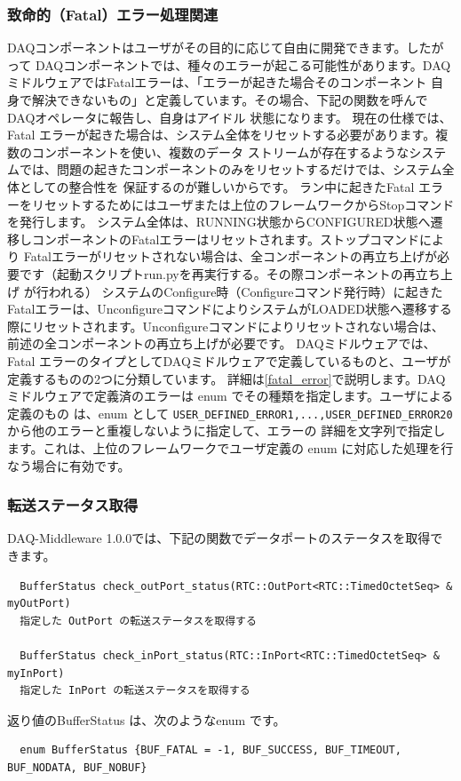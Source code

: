 \documentclass[a4j,10pt,dvips,onecolumn,oneside,final]{jarticle}%
\begin{document}
\subsubsection{致命的（Fatal）エラー処理関連}\label{fatal}
DAQコンポーネントはユーザがその目的に応じて自由に開発できます。したがって
DAQコンポーネントでは、種々のエラーが起こる可能性があります。DAQミドルウェアではFatalエラーは、「エラーが起きた場合そのコンポーネント
自身で解決できないもの」と定義しています。その場合、下記の関数を呼んでDAQオペレータに報告し、自身はアイドル
状態になります。
現在の仕様では、Fatal エラーが起きた場合は、システム全体をリセットする必要があります。複数のコンポーネントを使い、複数のデータ
ストリームが存在するようなシステムでは、問題の起きたコンポーネントのみをリセットするだけでは、システム全体としての整合性を
保証するのが難しいからです。
ラン中に起きたFatal エラーをリセットするためにはユーザまたは上位のフレームワークからStopコマンドを発行します。
システム全体は、RUNNING状態からCONFIGURED状態へ遷移しコンポーネントのFatalエラーはリセットされます。ストップコマンドにより
Fatalエラーがリセットされない場合は、全コンポーネントの再立ち上げが必要です（起動スクリプトrun.pyを再実行する。その際コンポーネントの再立ち上げ
が行われる）
システムのConfigure時（Configureコマンド発行時）に起きたFatalエラーは、UnconfigureコマンドによりシステムがLOADED状態へ遷移する
際にリセットされます。Unconfigureコマンドによりリセットされない場合は、前述の全コンポーネントの再立ち上げが必要です。
DAQミドルウェアでは、Fatal エラーのタイプとしてDAQミドルウェアで定義しているものと、ユーザが定義するものの2つに分類しています。
詳細は\ref{fatal_error}で説明します。DAQミドルウェアで定義済のエラーは enum でその種類を指定します。ユーザによる定義のもの
は、enum として \verb|USER_DEFINED_ERROR1,...,USER_DEFINED_ERROR20|から他のエラーと重複しないように指定して、エラーの
詳細を文字列で指定します。これは、上位のフレームワークでユーザ定義の enum に対応した処理を行なう場合に有効です。

\subsubsection{転送ステータス取得}\label{portstat}
DAQ-Middleware 1.0.0では、下記の関数でデータポートのステータスを取得できます。
\begin{Verbatim}  
  BufferStatus check_outPort_status(RTC::OutPort<RTC::TimedOctetSeq> & myOutPort) 
  指定した OutPort の転送ステータスを取得する

  BufferStatus check_inPort_status(RTC::InPort<RTC::TimedOctetSeq> & myInPort)
  指定した InPort の転送ステータスを取得する    
\end{Verbatim}
返り値のBufferStatus は、次のようなenum です。
\begin{Verbatim}
  enum BufferStatus {BUF_FATAL = -1, BUF_SUCCESS, BUF_TIMEOUT, BUF_NODATA, BUF_NOBUF}
\end{Verbatim}
\end{document}
